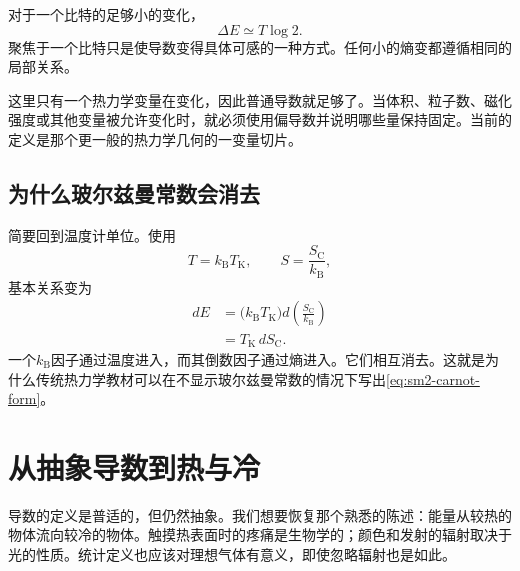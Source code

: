 对于一个比特的足够小的变化，
\begin{equation}
 \Delta E\simeq T\log2.
 \label{eq:sm2-one-bit-energy}
\end{equation}
聚焦于一个比特只是使导数变得具体可感的一种方式。任何小的熵变都遵循相同的局部关系。

\begin{classroomqa}
\end{classroomqa}

这里只有一个热力学变量在变化，因此普通导数就足够了。当体积、粒子数、磁化强度或其他变量被允许变化时，就必须使用偏导数并说明哪些量保持固定。当前的定义是那个更一般的热力学几何的一变量切片。

\subsection{为什么玻尔兹曼常数会消去}

简要回到温度计单位。使用
\[
 T=k_{\mathrm B}T_{\mathrm K},
 \qquad
 S=\frac{S_{\mathrm C}}{k_{\mathrm B}},
\]
基本关系变为
\begin{align}
 dE
 &=\bigl(k_{\mathrm B}T_{\mathrm K}\bigr)
   d\left(\frac{S_{\mathrm C}}{k_{\mathrm B}}\right)\\
 &=T_{\mathrm K}\,dS_{\mathrm C}.
 \label{eq:sm2-carnot-form}
\end{align}
一个\(k_{\mathrm B}\)因子通过温度进入，而其倒数因子通过熵进入。它们相互消去。这就是为什么传统热力学教材可以在不显示玻尔兹曼常数的情况下写出\eqref{eq:sm2-carnot-form}。

\begin{classroomqa}
\end{classroomqa}

\section{从抽象导数到热与冷}

导数的定义是普适的，但仍然抽象。我们想要恢复那个熟悉的陈述：能量从较热的物体流向较冷的物体。触摸热表面时的疼痛是生物学的；颜色和发射的辐射取决于光的性质。统计定义也应该对理想气体有意义，即使忽略辐射也是如此。


